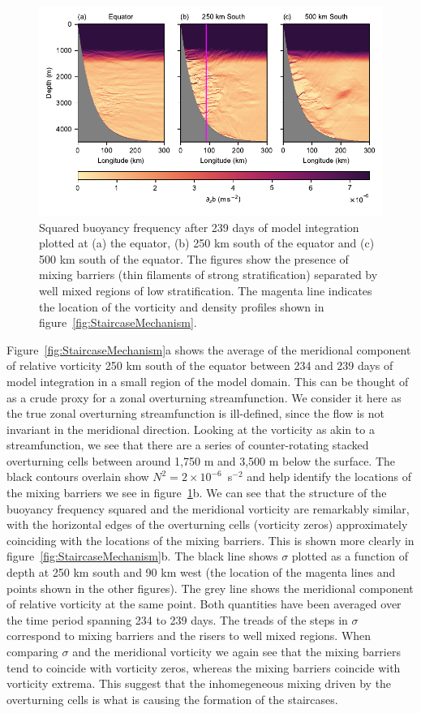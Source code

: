 \begin{figure}[h]
    \centering
    \includegraphics{../figures/Figure2.pdf}
    \caption{Squared buoyancy frequency after 239 days of model integration plotted at (a) the equator,  (b) 250 km south of the equator and (c) 500 km south of the equator. The figures show the presence of mixing barriers (thin filaments of strong stratification) separated by well mixed regions of low stratification. The magenta line indicates the location of the vorticity and density profiles shown in figure~\ref{fig:StaircaseMechanism}.}
    \label{fig:staircase}
\end{figure}

Figure~\ref{fig:StaircaseMechanism}a shows the average of the meridional component of relative vorticity 250 km south of the equator between 234 and 239  days of model integration in a small region of the model domain. This can be thought of as a crude proxy for a zonal overturning streamfunction. We consider it here as the true zonal overturning streamfunction is ill-defined, since the flow is not invariant in the meridional direction. Looking at the vorticity as akin to a streamfunction, we see that there are a series of counter-rotating stacked overturning cells between around 1,750 m and 3,500 m below the surface. The black contours overlain show $N^2 = 2 \times 10^{-6}$~s$^{-2}$ and help identify the locations of the mixing barriers we see in figure~\ref{fig:staircase}b. We can see that the structure of the buoyancy frequency squared and the meridional vorticity are remarkably similar, with the horizontal edges of the overturning cells (vorticity zeros) approximately coinciding with the locations of the mixing barriers. This is shown more clearly in figure~\ref{fig:StaircaseMechanism}b. The black line shows $\sigma$  plotted as a function of  depth at 250 km south and 90 km west (the location of the magenta lines and points shown in the other  figures). The grey line shows the meridional component of relative vorticity at the same point. Both quantities  have  been averaged over the time period spanning 234 to 239 days. The treads of the steps in $\sigma$ correspond to mixing barriers and the risers to well mixed regions. When comparing $\sigma$ and the meridional vorticity we again see that the mixing barriers tend to coincide with vorticity zeros, whereas the mixing barriers coincide with vorticity extrema. This suggest that the inhomegeneous mixing driven by the overturning cells is what is causing the formation of the staircases.


